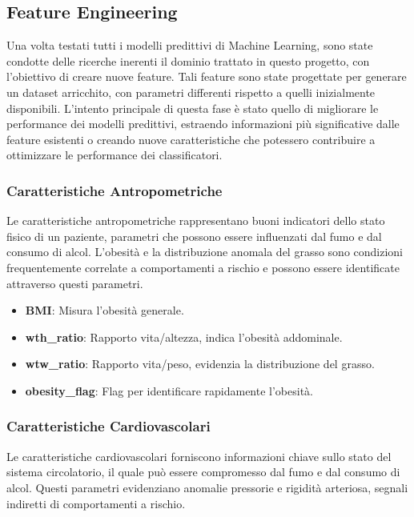\documentclass{article}
\begin{document}
\begin{multicols}{2}
\subsection{Feature Engineering}

Una volta testati tutti i modelli predittivi di Machine Learning, sono state condotte delle ricerche inerenti il dominio trattato in questo progetto, con l'obiettivo di creare nuove feature. Tali feature sono state progettate per generare un dataset arricchito, con parametri differenti rispetto a quelli inizialmente disponibili. L'intento principale di questa fase è stato quello di migliorare le performance dei modelli predittivi, estraendo informazioni più significative dalle feature esistenti o creando nuove caratteristiche che potessero contribuire a ottimizzare le performance dei classificatori.

\subsubsection{Caratteristiche Antropometriche}

Le caratteristiche antropometriche rappresentano buoni indicatori dello stato fisico di un paziente, parametri che possono essere influenzati dal fumo e dal consumo di alcol. L'obesità e la distribuzione anomala del grasso sono condizioni frequentemente correlate a comportamenti a rischio e possono essere identificate attraverso questi parametri.

\begin{itemize}[leftmargin=*]
    \item \textbf{BMI}: Misura l'obesità generale.
    \item \textbf{wth\_ratio}: Rapporto vita/altezza, indica l'obesità addominale.
    \item \textbf{wtw\_ratio}: Rapporto vita/peso, evidenzia la distribuzione del grasso.
    \item \textbf{obesity\_flag}: Flag per identificare rapidamente l'obesità.
\end{itemize}

\subsubsection{Caratteristiche Cardiovascolari}

Le caratteristiche cardiovascolari forniscono informazioni chiave sullo stato del sistema circolatorio, il quale può essere compromesso dal fumo e dal consumo di alcol. Questi parametri evidenziano anomalie pressorie e rigidità arteriosa, segnali indiretti di comportamenti a rischio.


\end{multicols}
\end{document}
